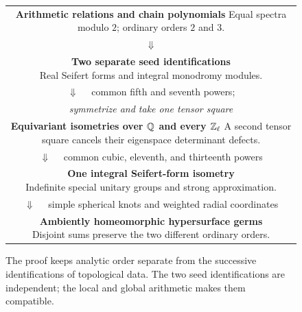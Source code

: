 \begin{figure}[htbp]
\centering
\begingroup
\setlength{\tabcolsep}{0pt}
\renewcommand{\arraystretch}{1.08}
\begin{tabular}{c}
\fbox{\parbox{.88\linewidth}{\centering
\textbf{Arithmetic relations and chain polynomials}\\
Equal spectra modulo $2$; ordinary orders $2$ and $3$.}}\\[3pt]
$\Downarrow$\\[3pt]
\fbox{\parbox{.88\linewidth}{\centering
\textbf{Two separate seed identifications}\\
Real Seifert forms \quad and \quad integral monodromy modules.}}\\[3pt]
$\Downarrow\quad$ common fifth and seventh powers;\\
\textit{symmetrize and take one tensor square}\\[3pt]
\fbox{\parbox{.88\linewidth}{\centering
\textbf{Equivariant isometries over $\Q$ and every $\Z_\ell$}\\
A second tensor square cancels their eigenspace determinant defects.}}\\[3pt]
$\Downarrow\quad$ common cubic, eleventh, and thirteenth powers\\[3pt]
\fbox{\parbox{.88\linewidth}{\centering
\textbf{One integral Seifert-form isometry}\\
Indefinite special unitary groups and strong approximation.}}\\[3pt]
$\Downarrow\quad$ simple spherical knots and weighted radial coordinates\\[3pt]
\fbox{\parbox{.88\linewidth}{\centering
\textbf{Ambiently homeomorphic hypersurface germs}\\
Disjoint sums preserve the two different ordinary orders.}}
\end{tabular}
\endgroup
\caption{The proof keeps analytic order separate from the successive
identifications of topological data. The two seed identifications are
independent; the local and global arithmetic makes them compatible.}
\label{fig:proof-route}
\end{figure}
